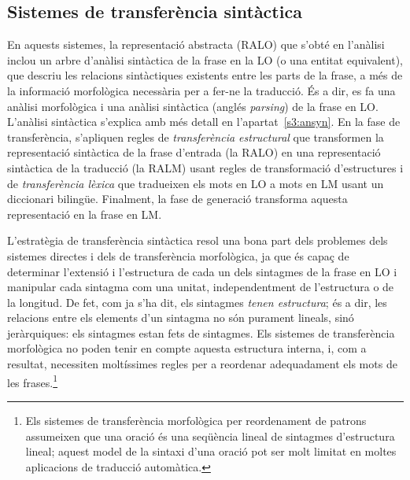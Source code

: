 \subsection{Sistemes de transferència sintàctica} 
\label{s3:transyn}

En aquests sistemes, la representació abstracta (RALO) que s'obté en
l'anàlisi inclou un arbre d'anàlisi sintàctica de la frase en la LO (o
una entitat equivalent), que descriu les relacions sintàctiques
existents entre les parts de la frase, a més de la informació
morfològica necessària per a fer-ne la traducció. És a dir, es fa una
anàlisi morfològica i una anàlisi sintàctica (anglés \emph{parsing})
de la frase en LO. L'anàlisi sintàctica s'explica amb més detall en
l'apartat~\ref{s3:ansyn}.  En la fase de transferència, s'apliquen
regles de \emph{transferència estructural} que transformen la
representació sintàctica de la frase d'entrada (la RALO) en una
representació sintàctica de la traducció (la RALM) usant regles de
transformació d'estructures i de \emph{transferència lèxica} que
tradueixen els mots en LO a mots en LM usant un diccionari bilingüe.
Finalment, la fase de generació transforma aquesta representació en la
frase en LM.

L'estratègia de transferència sintàctica resol una bona part dels
problemes dels sistemes directes i dels de transferència morfològica,
ja que és capaç de determinar l'extensió i l'estructura de cada un
dels sintagmes de la frase en LO i manipular cada sintagma com una
unitat, independentment de l'estructura o de la longitud.  De fet, com
ja s'ha dit, els sintagmes \emph{tenen estructura}; és a dir, les
relacions entre els elements d'un sintagma no són purament lineals,
sinó jeràrquiques: els sintagmes estan fets de sintagmes.  Els
sistemes de transferència morfològica no poden tenir en compte aquesta
estructura interna, i, com a resultat, necessiten moltíssimes regles
per a reordenar adequadament els mots de les frases.\footnote{Els
  sistemes de transferència morfològica per reordenament de patrons
  assumeixen que una oració és una seqüència lineal de sintagmes
  d'estructura lineal; aquest model de la sintaxi d'una oració pot ser
  molt limitat en moltes aplicacions de traducció automàtica.}


